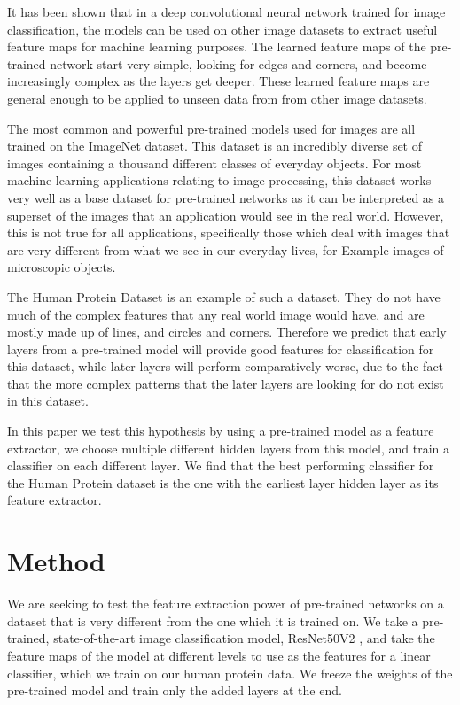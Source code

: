 \documentclass{article}
\begin{document}
It has been shown that in a deep convolutional neural network trained for image classification, the models
can be used on other image datasets to extract useful feature maps for machine learning purposes. The learned 
feature maps of the pre-trained network start very simple, looking for edges and corners, and become increasingly
complex as the layers get deeper.\cite{10.1007/978-3-319-10590-1_53} These learned feature maps are general enough to be applied to unseen data from 
from other image datasets\cite{NIPS2014_5347}.

The most common and powerful pre-trained models used for images are all trained on the ImageNet dataset\cite{imagenet_cvpr09}. This dataset
is an incredibly diverse set of images containing a thousand different classes of everyday objects. For most machine learning
applications relating to image processing, this dataset works very well as a base dataset for pre-trained networks as it can 
be interpreted as a superset of the images that an application would see in the real world. However, this is not true for all
applications, specifically those which deal with images that are very different from what we see in our everyday lives, for Example
images of microscopic objects.

The Human Protein Dataset is an example of such a dataset. They do not have much of the complex features that any real world image would have, and are mostly made up of 
lines, and circles and corners. Therefore we predict that early layers from a pre-trained model will
provide good features for classification for this dataset, while later layers will perform comparatively worse, 
due to the fact that the more complex patterns that the later layers are looking for do not exist in this 
dataset. 

In this paper we test this hypothesis by using a pre-trained model as a feature extractor, we choose multiple different
hidden layers from this model, and train a classifier on each different layer. We find that the best performing classifier
for the Human Protein dataset is the one with the earliest layer hidden layer as its feature extractor.
\section{Method}
We are seeking to test the feature extraction power of pre-trained networks on 
a dataset that is very different from the one which it is trained on. We take 
a pre-trained, state-of-the-art image classification model, ResNet50V2 \cite{DBLP:journals/corr/HeZR016}, and take
the feature maps of the model at different levels to use as the features for 
a linear classifier, which we train on our human protein data. We freeze the weights
of the pre-trained model and train only the added layers at the end.
\end{document}
